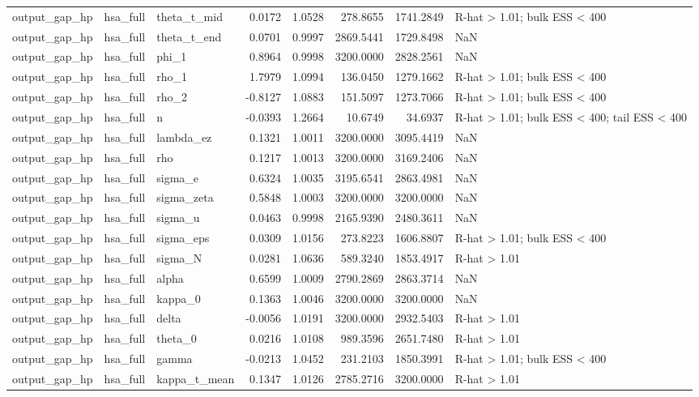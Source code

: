 \begin{tabular}{lllrrrrl}
output\_gap\_hp & hsa\_full & theta\_t\_mid & 0.0172 & 1.0528 & 278.8655 & 1741.2849 & R-hat > 1.01; bulk ESS < 400 \\
output\_gap\_hp & hsa\_full & theta\_t\_end & 0.0701 & 0.9997 & 2869.5441 & 1729.8498 & NaN \\
output\_gap\_hp & hsa\_full & phi\_1 & 0.8964 & 0.9998 & 3200.0000 & 2828.2561 & NaN \\
output\_gap\_hp & hsa\_full & rho\_1 & 1.7979 & 1.0994 & 136.0450 & 1279.1662 & R-hat > 1.01; bulk ESS < 400 \\
output\_gap\_hp & hsa\_full & rho\_2 & -0.8127 & 1.0883 & 151.5097 & 1273.7066 & R-hat > 1.01; bulk ESS < 400 \\
output\_gap\_hp & hsa\_full & n & -0.0393 & 1.2664 & 10.6749 & 34.6937 & R-hat > 1.01; bulk ESS < 400; tail ESS < 400 \\
output\_gap\_hp & hsa\_full & lambda\_ez & 0.1321 & 1.0011 & 3200.0000 & 3095.4419 & NaN \\
output\_gap\_hp & hsa\_full & rho & 0.1217 & 1.0013 & 3200.0000 & 3169.2406 & NaN \\
output\_gap\_hp & hsa\_full & sigma\_e & 0.6324 & 1.0035 & 3195.6541 & 2863.4981 & NaN \\
output\_gap\_hp & hsa\_full & sigma\_zeta & 0.5848 & 1.0003 & 3200.0000 & 3200.0000 & NaN \\
output\_gap\_hp & hsa\_full & sigma\_u & 0.0463 & 0.9998 & 2165.9390 & 2480.3611 & NaN \\
output\_gap\_hp & hsa\_full & sigma\_eps & 0.0309 & 1.0156 & 273.8223 & 1606.8807 & R-hat > 1.01; bulk ESS < 400 \\
output\_gap\_hp & hsa\_full & sigma\_N & 0.0281 & 1.0636 & 589.3240 & 1853.4917 & R-hat > 1.01 \\
output\_gap\_hp & hsa\_full & alpha & 0.6599 & 1.0009 & 2790.2869 & 2863.3714 & NaN \\
output\_gap\_hp & hsa\_full & kappa\_0 & 0.1363 & 1.0046 & 3200.0000 & 3200.0000 & NaN \\
output\_gap\_hp & hsa\_full & delta & -0.0056 & 1.0191 & 3200.0000 & 2932.5403 & R-hat > 1.01 \\
output\_gap\_hp & hsa\_full & theta\_0 & 0.0216 & 1.0108 & 989.3596 & 2651.7480 & R-hat > 1.01 \\
output\_gap\_hp & hsa\_full & gamma & -0.0213 & 1.0452 & 231.2103 & 1850.3991 & R-hat > 1.01; bulk ESS < 400 \\
output\_gap\_hp & hsa\_full & kappa\_t\_mean & 0.1347 & 1.0126 & 2785.2716 & 3200.0000 & R-hat > 1.01 \\

\end{tabular}
